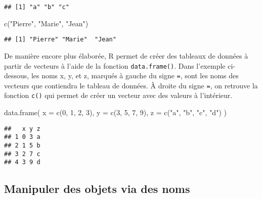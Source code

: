 \documentclass[
]{book}
\newenvironment{Shaded}{\begin{snugshade}}{\end{snugshade}}
\newcommand{\AttributeTok}[1]{\textcolor[rgb]{0.77,0.63,0.00}{#1}}
\newcommand{\DecValTok}[1]{\textcolor[rgb]{0.00,0.00,0.81}{#1}}
\newcommand{\FunctionTok}[1]{\textcolor[rgb]{0.00,0.00,0.00}{#1}}
\newcommand{\NormalTok}[1]{#1}
\newcommand{\StringTok}[1]{\textcolor[rgb]{0.31,0.60,0.02}{#1}}
\begin{document}
\begin{verbatim}
## [1] "a" "b" "c"
\end{verbatim}

\begin{Shaded}
\begin{Highlighting}[]
\FunctionTok{c}\NormalTok{(}\StringTok{"Pierre"}\NormalTok{, }\StringTok{"Marie"}\NormalTok{, }\StringTok{"Jean"}\NormalTok{)}
\end{Highlighting}
\end{Shaded}

\begin{verbatim}
## [1] "Pierre" "Marie"  "Jean"
\end{verbatim}

De manière encore plus élaborée, R permet de créer des tableaux de données à partir de vecteurs à l'aide de la fonction \texttt{data.frame()}. Dans l'exemple ci-dessous, les noms x, y, et z, marqués à gauche du signe \texttt{=}, sont les noms des vecteurs que contiendra le tableau de données. À droite du signe \texttt{=}, on retrouve la fonction \texttt{c()} qui permet de créer un vecteur avec des valeurs à l'intérieur.

\begin{Shaded}
\begin{Highlighting}[]
\FunctionTok{data.frame}\NormalTok{(}
  \AttributeTok{x =} \FunctionTok{c}\NormalTok{(}\DecValTok{0}\NormalTok{, }\DecValTok{1}\NormalTok{, }\DecValTok{2}\NormalTok{, }\DecValTok{3}\NormalTok{),}
  \AttributeTok{y =} \FunctionTok{c}\NormalTok{(}\DecValTok{3}\NormalTok{, }\DecValTok{5}\NormalTok{, }\DecValTok{7}\NormalTok{, }\DecValTok{9}\NormalTok{),}
  \AttributeTok{z =} \FunctionTok{c}\NormalTok{(}\StringTok{"a"}\NormalTok{, }\StringTok{"b"}\NormalTok{, }\StringTok{"c"}\NormalTok{, }\StringTok{"d"}\NormalTok{)}
\NormalTok{)}
\end{Highlighting}
\end{Shaded}

\begin{verbatim}
##   x y z
## 1 0 3 a
## 2 1 5 b
## 3 2 7 c
## 4 3 9 d
\end{verbatim}

\hypertarget{manipuler-des-objets-via-des-noms}{%
\subsection{Manipuler des objets via des noms}\label{manipuler-des-objets-via-des-noms}}
\end{document}
